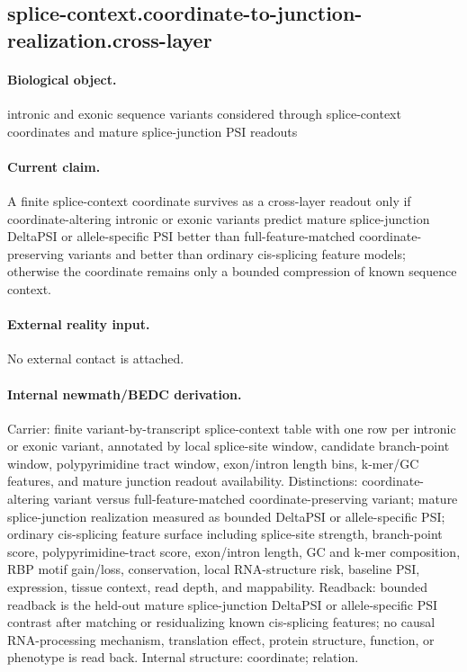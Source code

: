 \subsection{splice-context.coordinate-to-junction-realization.cross-layer}

\paragraph{Biological object.} intronic and exonic sequence variants considered through splice-context coordinates and mature splice-junction PSI readouts

\paragraph{Current claim.} A finite splice-context coordinate survives as a cross-layer readout only if coordinate-altering intronic or exonic variants predict mature splice-junction DeltaPSI or allele-specific PSI better than full-feature-matched coordinate-preserving variants and better than ordinary cis-splicing feature models; otherwise the coordinate remains only a bounded compression of known sequence context.

\paragraph{External reality input.}
No external contact is attached.

\paragraph{Internal newmath/BEDC derivation.} Carrier: finite variant-by-transcript splice-context table with one row per intronic or exonic variant, annotated by local splice-site window, candidate branch-point window, polypyrimidine tract window, exon/intron length bins, k-mer/GC features, and mature junction readout availability. Distinctions: coordinate-altering variant versus full-feature-matched coordinate-preserving variant; mature splice-junction realization measured as bounded DeltaPSI or allele-specific PSI; ordinary cis-splicing feature surface including splice-site strength, branch-point score, polypyrimidine-tract score, exon/intron length, GC and k-mer composition, RBP motif gain/loss, conservation, local RNA-structure risk, baseline PSI, expression, tissue context, read depth, and mappability. Readback: bounded readback is the held-out mature splice-junction DeltaPSI or allele-specific PSI contrast after matching or residualizing known cis-splicing features; no causal RNA-processing mechanism, translation effect, protein structure, function, or phenotype is read back. Internal structure: coordinate; relation.


